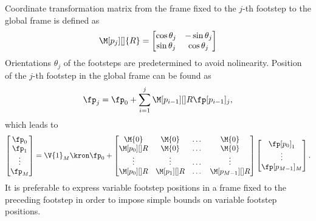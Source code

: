 Coordinate transformation matrix from the frame fixed to the $j$-th footstep to
the global frame is defined as
%
\begin{equation}
    \M[p_j][]{R} =
    \begin{bmatrix}
        \cos{\theta_j}  &   -\sin{\theta_j} \\
        \sin{\theta_j}  &   \cos{\theta_j} \\
    \end{bmatrix}
\end{equation}
%
Orientations $\theta_j$ of the footsteps are predetermined to avoid
nolinearity. Position of the $j$-th footstep in the global frame can be found
as
%
\begin{equation}
    \fp_j = \fp_0 + \sum_{i=1}^{j}  \M[p_{i-1}][]{R} \fp[p_{i-1}]_j,
\end{equation}
%
which leads to
%
\begin{equation}
    \begin{bmatrix}
        \fp_0\\
        \fp_1\\
        \vdots\\
        \fp_M\\
    \end{bmatrix}
    =
    \V{1}_M
    \kron
    \fp_0
    +
    \begin{bmatrix}
        \M{0}           & \M{0}             & \dots & \M{0}             \\
        \M[p_{0}][]{R}  & \M{0}             & \dots & \M{0}             \\
        \vdots          & \vdots            & \dots & \vdots            \\
        \M[p_{0}][]{R}  & \M[p_{1}][]{R}    & \dots & \M[p_{M-1}][]{R}  \\
    \end{bmatrix}
    \begin{bmatrix}
        \fp[p_0]_1\\
        \vdots\\
        \fp[p_{M-1}]_M\\
    \end{bmatrix}.
\end{equation}
%
It is preferable to express variable footstep positions in a frame fixed to the
preceding footstep in order to impose simple bounds on variable footstep
positions.



